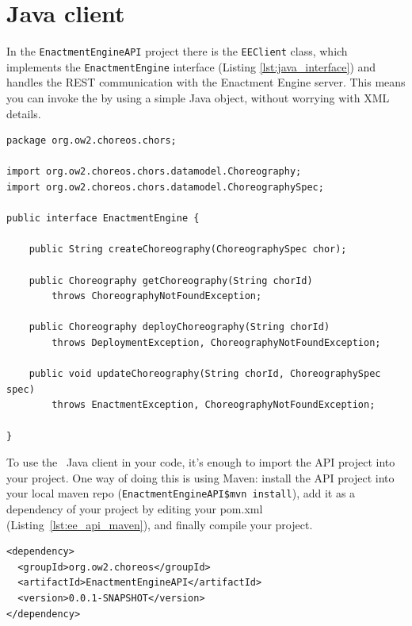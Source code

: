 \section{Java client}
\label{sec:client}

In the \verb!EnactmentEngineAPI! project there is the \verb!EEClient! class, which implements the \verb!EnactmentEngine! interface (Listing \ref{lst:java_interface}) and handles the REST communication with the Enactment Engine server. This means you can invoke the \ee by using a simple Java object, without worrying with XML details.

{\footnotesize
\lstset{language=Java}
\begin{lstlisting}[caption=\ee\ Java interface., label=lst:java_interface]
package org.ow2.choreos.chors;

import org.ow2.choreos.chors.datamodel.Choreography;
import org.ow2.choreos.chors.datamodel.ChoreographySpec;

public interface EnactmentEngine {

    public String createChoreography(ChoreographySpec chor);

    public Choreography getChoreography(String chorId) 
        throws ChoreographyNotFoundException;

    public Choreography deployChoreography(String chorId) 
        throws DeploymentException, ChoreographyNotFoundException;

    public void updateChoreography(String chorId, ChoreographySpec spec) 
        throws EnactmentException, ChoreographyNotFoundException;

}
\end{lstlisting}
}

To use the \ee\ Java client in your code, it's enough to import the API project into your project. One way of doing this is using Maven: install the API project into your local maven repo (\texttt{EnactmentEngineAPI\$mvn install}), add it as a dependency of your project by editing your pom.xml (Listing~\ref{lst:ee_api_maven}), and finally compile your project.

{\footnotesize
\lstset{language=XML}
\begin{lstlisting}[caption=Adding EnactmentEngineAPI as a dependency of your project., label=lst:ee_api_maven]
<dependency>
  <groupId>org.ow2.choreos</groupId>
  <artifactId>EnactmentEngineAPI</artifactId>
  <version>0.0.1-SNAPSHOT</version>
</dependency>
\end{lstlisting}
}

